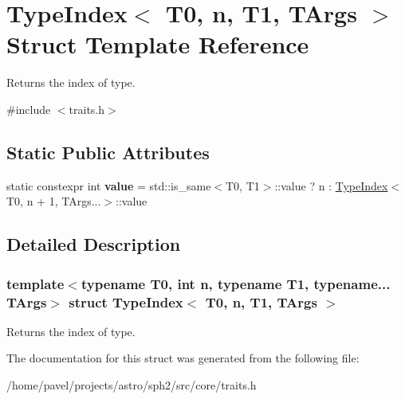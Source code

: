 \hypertarget{structTypeIndex}{}\section{Type\+Index$<$ T0, n, T1, T\+Args $>$ Struct Template Reference}
\label{structTypeIndex}


Returns the index of type.  




{\ttfamily \#include $<$traits.\+h$>$}

\subsection*{Static Public Attributes}
\begin{DoxyCompactItemize}
\item 
\hypertarget{structTypeIndex_a6f89d0411b384a66b010621075b68858}{}\label{structTypeIndex_a6f89d0411b384a66b010621075b68858} 
static constexpr int {\bfseries value} = std\+::is\+\_\+same$<$T0, T1$>$\+::value ? n \+: \hyperlink{structTypeIndex}{Type\+Index}$<$T0, n + 1, T\+Args...$>$\+::value
\end{DoxyCompactItemize}


\subsection{Detailed Description}
\subsubsection*{template$<$typename T0, int n, typename T1, typename... T\+Args$>$\newline
struct Type\+Index$<$ T0, n, T1, T\+Args $>$}

Returns the index of type. 

The documentation for this struct was generated from the following file\+:\begin{DoxyCompactItemize}
\item 
/home/pavel/projects/astro/sph2/src/core/traits.\+h\end{DoxyCompactItemize}
